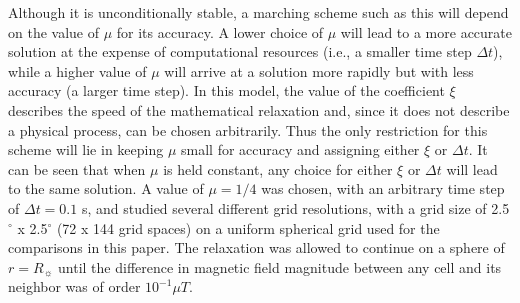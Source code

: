 Although it is unconditionally stable, a marching scheme such as this will depend on the value of $\mu$ for its accuracy. A lower choice of $\mu$ will lead to a more accurate solution at the expense of computational resources (i.e., a smaller time step ${\Delta}t$), while a higher value of $\mu$ will arrive at a solution more rapidly but with less accuracy (a larger time step). In this model, the value of the coefficient $\xi$ describes the speed of the mathematical relaxation and, since it does not describe a physical process, can be chosen arbitrarily. Thus the only restriction for this scheme will lie in keeping $\mu$ small for accuracy and assigning either $\xi$ or ${\Delta}t$. It can be seen that when $\mu$ is held constant, any choice for either $\xi$ or ${\Delta}t$ will lead to the same solution. A value of $\mu=1/4$ was chosen, with an arbitrary time step of ${\Delta}t=0.1$ s, and studied several different grid resolutions, with a grid size of 2.5$^\circ$ x 2.5$^\circ$ (72 x 144 grid spaces) on a uniform spherical grid used for the comparisons in this paper. The relaxation was allowed to continue on a sphere of $r=R_{\sun}$ until the difference in magnetic field magnitude between any cell and its neighbor was of order $10^{-1}{\mu}T$.